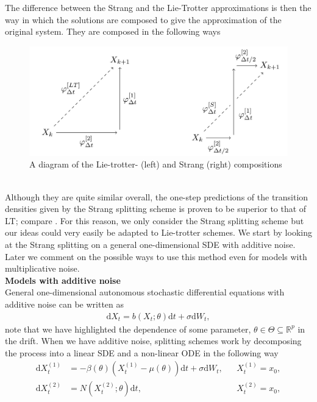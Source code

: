 The difference between the Strang and the Lie-Trotter approximations is then the way in which the solutions are composed to give the approximation of the original system. They are composed in the following ways
\begin{figure}[h!]
    \begin{center}
    \includegraphics[scale = .185]{figures/strangAndLieTrotter.jpeg}
    \end{center}
    \caption{A diagram of the Lie-trotter- (left) and Strang (right) compositions}
    \label{figure:StrangAndLieTrotterPlot}
\end{figure}\\
Although they are quite similar overall, the one-step predictions of the transition densities given by the Strang splitting scheme is proven to be superior to that of LT; compare \cite[Proposition 3.4 and 3.6]{SplittingSchemes}. For this reason, we only consider the Strang splitting scheme but our ideas could very easily be adapted to Lie-trotter schemes. We start by looking at the Strang splitting on a general one-dimensional SDE with additive noise. Later we comment on the possible ways to use this method even for models with multiplicative noise.\\
\textbf{Models with additive noise}\\
General one-dimensional autonomous stochastic differential equations with additive noise can be written as
\begin{align}
    \mathrm{d}X_t = b(X_t; \theta)\mathrm{d}t + \sigma\mathrm{d}W_t, \label{eq:generalAdditiveNoiseSDE}
\end{align}
note that we have highlighted the dependence of some parameter, $\theta\in\Theta\subseteq\mathbb{R}^p$ in the drift. When we have additive noise, splitting schemes work by decomposing the process into a linear SDE and a non-linear ODE in the following way
\begin{align}
    \mathrm{d}X_t^{(1)} &= -\beta(\theta)\left(X_t^{(1)} - \mu(\theta)\right)\mathrm{d}t + \sigma \mathrm{d}W_t, &&X_t^{(1)} = x_0, \label{SDE_split}\\
    \mathrm{d}X_t^{(2)} &= N\left(X_t^{(2)}; \theta\right)\mathrm{d}t, &&X_t^{(2)} = x_0, \label{ODE_Split}
\end{align}
